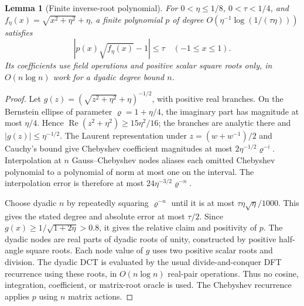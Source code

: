 \documentclass[11pt]{article}
\newtheorem{lemma}[theorem]{Lemma}
\begin{document}
\begin{lemma}[Finite inverse-root polynomial]\label{lem:poly}
For \(0<\eta\leq1/8\), \(0<\tau<1/4\), and
\(f_\eta(x)=\sqrt{x^2+\eta^2}+\eta\), a finite polynomial \(p\)
of degree \(O(\eta^{-1}\log(1/(\tau\eta)))\) satisfies
\[
 |p(x)\sqrt{f_\eta(x)}-1|\leq\tau\quad(-1\leq x\leq1).
\]
Its coefficients use field operations and positive scalar square roots
only, in \(O(n\log n)\) work for a dyadic degree bound \(n\).
\end{lemma}
\begin{proof}
Let \(g(z)=(\sqrt{z^2+\eta^2}+\eta)^{-1/2}\), with positive real
branches. On the Bernstein ellipse of parameter
\(\varrho=1+\eta/4\), the imaginary part has magnitude at most
\(\eta/4\). Hence \(\operatorname{Re}(z^2+\eta^2)\geq15\eta^2/16\);
the branches are analytic there and \(|g(z)|\leq\eta^{-1/2}\).
The Laurent representation under \(z=(w+w^{-1})/2\) and Cauchy's
bound give Chebyshev coefficient magnitudes at most
\(2\eta^{-1/2}\varrho^{-i}\). Interpolation at \(n\) Gauss--Chebyshev
nodes aliases each omitted Chebyshev polynomial to a polynomial of norm
at most one on the interval. The interpolation error is therefore at
most \(24\eta^{-3/2}\varrho^{-n}\).

Choose dyadic \(n\) by repeatedly squaring \(\varrho^{-n}\) until it
is at most \(\tau\eta\sqrt\eta/1000\). This gives the stated degree
and absolute error at most \(\tau/2\). Since
\(g(x)\geq1/\sqrt{1+2\eta}>0.8\), it gives the relative claim and
positivity of \(p\). The dyadic nodes are real parts of dyadic roots
of unity, constructed by positive half-angle square roots. Each node
value of \(g\) uses two positive scalar roots and division. The dyadic
DCT is evaluated by the usual divide-and-conquer DFT recurrence using
these roots, in \(O(n\log n)\) real-pair operations. Thus no cosine,
integration, coefficient, or matrix-root oracle is used. The Chebyshev
recurrence applies \(p\) using \(n\) matrix actions.
\end{proof}
\end{document}
